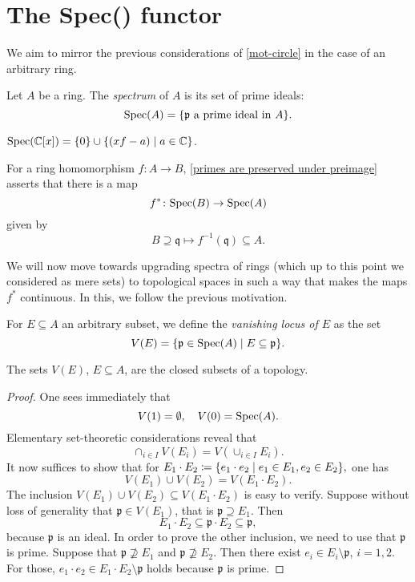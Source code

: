 \section{The Spec() functor}
We aim to mirror the previous considerations of \cref{mot-circle} in the case of an arbitrary ring.

\begin{df}
Let $A$ be a ring. The \textit{spectrum} of $A$ is its set of prime ideals:
\[\text{Spec}(A) = \{ \mathfrak p \text{ a prime ideal in } A \}.\]
\end{df}

\begin{example}
  $\text{Spec}(\mathbb C [x]) =  \{0\} \cup \{ (xf-a) \mathrel{|} a \in \mathbb C \}$.
\end{example}

For a ring homomorphism $f \colon A \to B$, \cref{primes are preserved under preimage} asserts that there is a map
\[f^* \colon \text{Spec}(B) \to \text{Spec}(A)\]
given by 
\[B \supseteq \mathfrak q \mapsto f^{-1}(\mathfrak q) \subseteq A.\]

We will now move towards upgrading spectra of rings (which up to this point we considered as mere sets) to topological spaces in such a way that makes the maps $f^*$ continuous. In this, we follow the previous motivation.

\begin{df}
  \label{def vanishing locus}
For $E \subseteq A$ an arbitrary subset, we define the \textit{vanishing locus of $E$} as the set
\[V(E) = \{ \mathfrak p \in \text{Spec}(A) \mathrel{|} E \subseteq \mathfrak p \} .\]
\end{df}

\begin{prop}
  \label{zariski-prop}
  The sets $V(E)$, $E \subseteq A$, are the closed subsets of a topology.
\end{prop}

\begin{proof}
  One sees immediately that
  \[ V(1) = \emptyset, \quad V(0) = \text{Spec}(A).\]
  Elementary set-theoretic considerations reveal that
  \[\cap_{i \in I} V(E_i) = V(\cup_{i \in I} E_i).\]
  It now suffices to show that for
  \(E_1 \cdot E_2 \coloneqq \{ e_1 \cdot e_2 \mathrel{|} e_1 \in E_1, e_2 \in E_2 \},\)
  one has
  \[ V(E_1) \cup V(E_2) = V(E_1 \cdot E_2).\]
  The inclusion $V(E_1) \cup V(E_2) \subseteq V(E_1 \cdot E_2)$ is easy to verify.
  Suppose without loss of generality that $\mathfrak p \in V(E_1)$, that is
  $\mathfrak p \supseteq E_1.$
  Then
  \[ E_1 \cdot E_2 \subseteq \mathfrak p \cdot E_2 \subseteq \mathfrak p,\]
  because $\mathfrak p$ is an ideal.
  In order to prove the other inclusion, we need to use that $\mathfrak p$ is prime.
  Suppose that
  \( \mathfrak p \not\supseteq E_1\) and \(\mathfrak p \not\supseteq   E_2.\)
  Then there exist $e_i \in E_i \setminus \mathfrak p$, $i=1,2$. For those,
  \( e_1 \cdot e_2 \in E_1 \cdot E_2 \setminus \mathfrak p\)
  holds because $\mathfrak p$ is prime.
\end{proof}

